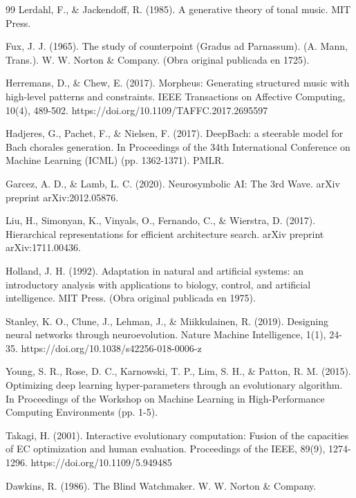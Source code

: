 \documentclass[12pt]{report}
\begin{document}
\begin{thebibliography}{99}
 Lerdahl, F., \& Jackendoff, R. (1985). A generative theory of tonal music. MIT Press.

 Fux, J. J. (1965). The study of counterpoint (Gradus ad Parnassum). (A. Mann, Trans.). W. W. Norton \& Company. (Obra original publicada en 1725).

 Herremans, D., \& Chew, E. (2017). Morpheus: Generating structured music with high-level patterns and constraints. IEEE Transactions on Affective Computing, 10(4), 489-502. https://doi.org/10.1109/TAFFC.2017.2695597

 Hadjeres, G., Pachet, F., \& Nielsen, F. (2017). DeepBach: a steerable model for Bach chorales generation. In Proceedings of the 34th International Conference on Machine Learning (ICML) (pp. 1362-1371). PMLR.

 Garcez, A. D., \& Lamb, L. C. (2020). Neurosymbolic AI: The 3rd Wave. arXiv preprint arXiv:2012.05876.

 Liu, H., Simonyan, K., Vinyals, O., Fernando, C., \& Wierstra, D. (2017). Hierarchical representations for efficient architecture search. arXiv preprint arXiv:1711.00436.

 Holland, J. H. (1992). Adaptation in natural and artificial systems: an introductory analysis with applications to biology, control, and artificial intelligence. MIT Press. (Obra original publicada en 1975).

 Stanley, K. O., Clune, J., Lehman, J., \& Miikkulainen, R. (2019). Designing neural networks through neuroevolution. Nature Machine Intelligence, 1(1), 24-35. https://doi.org/10.1038/s42256-018-0006-z

 Young, S. R., Rose, D. C., Karnowski, T. P., Lim, S. H., \& Patton, R. M. (2015). Optimizing deep learning hyper-parameters through an evolutionary algorithm. In Proceedings of the Workshop on Machine Learning in High-Performance Computing Environments (pp. 1-5).

 Takagi, H. (2001). Interactive evolutionary computation: Fusion of the capacities of EC optimization and human evaluation. Proceedings of the IEEE, 89(9), 1274-1296. https://doi.org/10.1109/5.949485

 Dawkins, R. (1986). The Blind Watchmaker. W. W. Norton \& Company.


\end{thebibliography}
\end{document}

